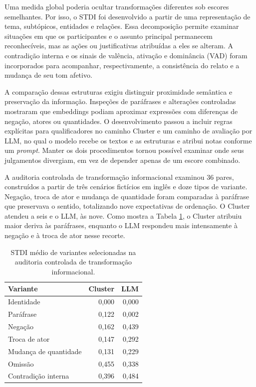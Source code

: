 Uma medida global poderia ocultar transformações diferentes sob escores semelhantes. Por isso, o STDI foi desenvolvido a partir de uma representação de tema, subtópicos, entidades e relações. Essa decomposição permite examinar situações em que os participantes e o assunto principal permanecem reconhecíveis, mas as ações ou justificativas atribuídas a eles se alteram. A contradição interna e os sinais de valência, ativação e dominância (VAD) foram incorporados para acompanhar, respectivamente, a consistência do relato e a mudança de seu tom afetivo.

A comparação dessas estruturas exigiu distinguir proximidade semântica e preservação da informação. Inspeções de paráfrases e alterações controladas mostraram que embeddings podiam aproximar expressões com diferenças de negação, atores ou quantidades. O desenvolvimento passou a incluir regras explícitas para qualificadores no caminho Cluster e um caminho de avaliação por LLM, no qual o modelo recebe os textos e as estruturas e atribui notas conforme um \textit{prompt}. Manter os dois procedimentos tornou possível examinar onde seus julgamentos divergiam, em vez de depender apenas de um escore combinado.

A auditoria controlada de transformação informacional examinou 36 pares, construídos a partir de três cenários fictícios em inglês e doze tipos de variante. Negação, troca de ator e mudança de quantidade foram comparadas à paráfrase que preservava o sentido, totalizando nove expectativas de ordenação. O Cluster atendeu a seis e o LLM, às nove. Como mostra a Tabela \ref{tab:metodos-controles}, o Cluster atribuiu maior deriva às paráfrases, enquanto o LLM respondeu mais intensamente à negação e à troca de ator nesse recorte.

\begin{table}[htbp]
\centering
\caption{STDI médio de variantes selecionadas na auditoria controlada de transformação informacional.}
\label{tab:metodos-controles}
\small
\begin{tabular}{lrr}
\hline
Variante & Cluster & LLM \\
\hline
Identidade & 0,000 & 0,000 \\
Paráfrase & 0,122 & 0,002 \\
Negação & 0,162 & 0,439 \\
Troca de ator & 0,147 & 0,292 \\
Mudança de quantidade & 0,131 & 0,229 \\
Omissão & 0,455 & 0,338 \\
Contradição interna & 0,396 & 0,484 \\
\hline
\end{tabular}
\end{table}

